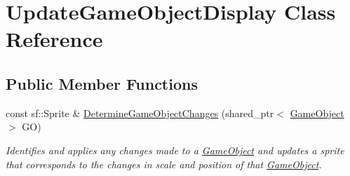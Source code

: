 \hypertarget{class_update_game_object_display}{}\section{Update\+Game\+Object\+Display Class Reference}
\label{class_update_game_object_display}
\subsection*{Public Member Functions}
\begin{DoxyCompactItemize}
\item 
const sf\+::\+Sprite \& \hyperlink{class_update_game_object_display_ac17a26f7563060fb9d4a0eb8959b1d29}{Determine\+Game\+Object\+Changes} (shared\+\_\+ptr$<$ \hyperlink{class_game_object}{Game\+Object} $>$ GO)
\begin{DoxyCompactList}\small\item\em Identifies and applies any changes made to a \hyperlink{class_game_object}{Game\+Object} and updates a sprite that corresponds to the changes in scale and position of that \hyperlink{class_game_object}{Game\+Object}. \end{DoxyCompactList}\end{DoxyCompactItemize}
